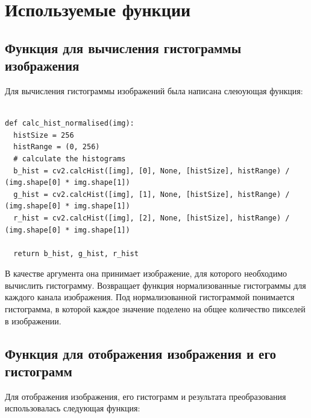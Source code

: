 \documentclass[a4paper, 12pt]{extarticle}
\makeatletter
\renewcommand\tableofcontents{ 
  \begin{singlespace}
    \null\hfill\textbf{\Large\contentsname}\hfill\null\par
    \@mkboth{\MakeUppercase\contentsname}{\MakeUppercase\contentsname}%
    \@starttoc{toc}%
  \end{singlespace}
}
\makeatother
\begin{document}


\tableofcontents
\newpage

\section{Используемые функции}

\subsection{Функция для вычисления гистограммы изображения}

Для вычисления гистограммы изображений была написана слеюующая функция:

\begin{lstlisting}

def calc_hist_normalised(img):
  histSize = 256
  histRange = (0, 256)
  # calculate the histograms
  b_hist = cv2.calcHist([img], [0], None, [histSize], histRange) / (img.shape[0] * img.shape[1])
  g_hist = cv2.calcHist([img], [1], None, [histSize], histRange) / (img.shape[0] * img.shape[1])
  r_hist = cv2.calcHist([img], [2], None, [histSize], histRange) / (img.shape[0] * img.shape[1])

  return b_hist, g_hist, r_hist
\end{lstlisting}

В качестве аргумента она принимает изображение, для которого необходимо вычислить гистограмму. Возвращает функция нормализованные гистограммы для каждого канала изображения.
Под нормализованной гистограммой понимается гистограмма, в которой каждое значение поделено на общее количество пикселей в изображении.

\subsection{Функция для отображения изображения и его гистограмм}
Для отображения изображения, его гистограмм и результата преобразования использовалась следующая функция: 
\end{document}

